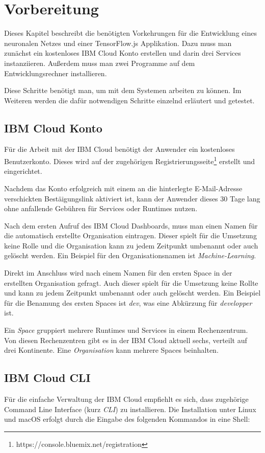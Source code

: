 \section{Vorbereitung}
Dieses Kapitel beschreibt die benötigten Vorkehrungen für die Entwicklung eines neuronalen Netzes und einer
TensorFlow.js Applikation. Dazu muss man zunächst ein kostenloses IBM Cloud Konto erstellen und darin drei Services
instanziieren. Außerdem muss man zwei Programme auf dem Entwicklungsrechner installieren.

Diese Schritte benötigt man, um mit dem Systemen arbeiten zu können. Im Weiteren werden die dafür notwendigen Schritte
einzelnd erläutert und getestet.

\subsection{IBM Cloud Konto}
Für die Arbeit mit der IBM Cloud benötigt der Anwender ein kostenloses Benutzerkonto. Dieses wird auf der zugehörigen
Registrierungsseite\footnote{https://console.bluemix.net/registration} erstellt und eingerichtet.

Nachdem das Konto erfolgreich mit einem an die hinterlegte E-Mail-Adresse verschickten Bestäigungslink aktiviert ist,
kann der Anwender dieses 30 Tage lang ohne anfallende Gebühren für Services oder Runtimes nutzen.

Nach dem ersten Aufruf des IBM Cloud Dashboards, muss man einen Namen für die automatisch erstellte Organisation
eintragen. Dieser spielt für die Umsetzung keine Rolle und die Organisation kann zu jedem Zeitpunkt umbenannt oder auch
gelöscht werden. Ein Beispiel für den Organisationsnamen ist \textit{Machine-Learning}.

Direkt im Anschluss wird nach einem Namen für den ersten Space in der erstellten Organisation gefragt. Auch dieser
spielt für die Umsetzung keine Rollte und kann zu jedem Zeitpunkt umbenannt oder auch gelöscht werden. Ein Beispiel für
die Benamung des ersten Spaces ist \textit{dev}, was eine Abkürzung für \textit{developper} ist.

Ein \textit{Space} gruppiert mehrere Runtimes und Services in einem Rechenzentrum. Von diesen Rechenzentren gibt es in
der IBM Cloud aktuell sechs, verteilt auf drei Kontinente. Eine \textit{Organisation} kann mehrere Spaces beinhalten.

\subsection{IBM Cloud CLI}
Für die einfache Verwaltung der IBM Cloud empfiehlt es sich, dass zugehörige Command Line Interface (kurz \textit{CLI})
zu installieren. Die Installation unter Linux und macOS erfolgt durch die Eingabe des folgenden Kommandos in eine Shell:

